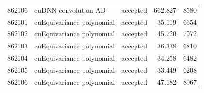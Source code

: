 \documentclass[11pt]{article}
\begin{document}
\begin{longtable}{rllrr}
862106 & cuDNN convolution AD & accepted & 662.827 & 8580\\
862101 & cuEquivariance polynomial & accepted & 35.119 & 6654\\
862102 & cuEquivariance polynomial & accepted & 45.720 & 7972\\
862103 & cuEquivariance polynomial & accepted & 36.338 & 6810\\
862104 & cuEquivariance polynomial & accepted & 34.258 & 6482\\
862105 & cuEquivariance polynomial & accepted & 33.449 & 6208\\
862106 & cuEquivariance polynomial & accepted & 47.182 & 8067\\
\bottomrule\end{longtable}\normalsize
\end{document}
